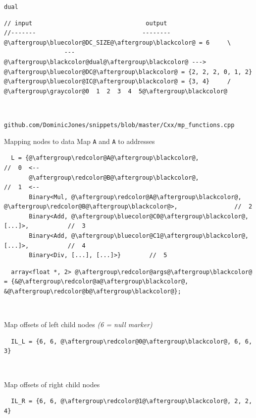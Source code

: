 \documentclass[xcolor=dvipsnames]{beamer}
\begin{document}
\begin{frame}[fragile]{\texttt{dual}}
\begin{lstlisting}
// input                                output
//-------                              --------
@\aftergroup\bluecolor@DC_SIZE@\aftergroup\blackcolor@ = 6     \
                 --- @\aftergroup\blackcolor@dual@\aftergroup\blackcolor@ --->    @\aftergroup\bluecolor@DC@\aftergroup\blackcolor@ = {2, 2, 2, 0, 1, 2}
@\aftergroup\bluecolor@IC@\aftergroup\blackcolor@ = {3, 4}     /                       @\aftergroup\graycolor@0  1  2  3  4  5@\aftergroup\blackcolor@
\end{lstlisting}

~

\vspace{5mm}
\footnotesize{\texttt{github.com/DominicJones/snippets/blob/master/Cxx/mp\_functions.cpp}}
\end{frame}


\begin{frame}[fragile]{Mapping nodes to data}
Map {\color{red}\texttt{A}} and {\color{red}\texttt{A}} to addresses
\begin{lstlisting}
  L = {@\aftergroup\redcolor@A@\aftergroup\blackcolor@,                                //  0  <--
       @\aftergroup\redcolor@B@\aftergroup\blackcolor@,                                //  1  <--
       Binary<Mul, @\aftergroup\redcolor@A@\aftergroup\blackcolor@, @\aftergroup\redcolor@B@\aftergroup\blackcolor@>,                //  2
       Binary<Add, @\aftergroup\bluecolor@C0@\aftergroup\blackcolor@, [...]>,           //  3
       Binary<Add, @\aftergroup\bluecolor@C1@\aftergroup\blackcolor@, [...]>,           //  4
       Binary<Div, [...], [...]>}        //  5
\end{lstlisting}
\begin{lstlisting}
  array<float *, 2> @\aftergroup\redcolor@args@\aftergroup\blackcolor@ = {&@\aftergroup\redcolor@a@\aftergroup\blackcolor@, &@\aftergroup\redcolor@b@\aftergroup\blackcolor@};
\end{lstlisting}


~

Map offsets of left child nodes \emph{(6 = null marker)}
\begin{lstlisting}
  IL_L = {6, 6, @\aftergroup\redcolor@0@\aftergroup\blackcolor@, 6, 6, 3}
\end{lstlisting}

~

Map offsets of right child nodes
\begin{lstlisting}
  IL_R = {6, 6, @\aftergroup\redcolor@1@\aftergroup\blackcolor@, 2, 2, 4}
\end{lstlisting}
\end{frame}
\end{document}
